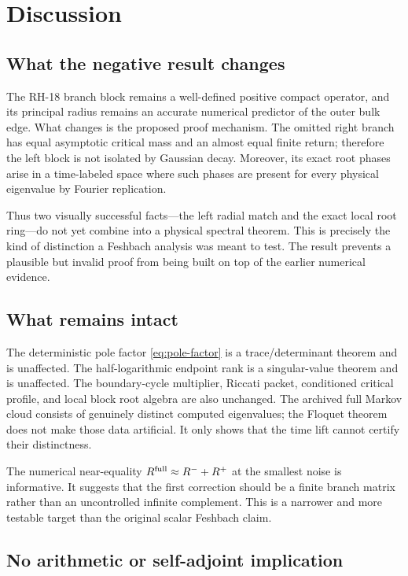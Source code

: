 \documentclass[11pt]{article}
\theoremstyle{definition}
\theoremstyle{remark}
\begin{document}
\section{Discussion}
\label{sec:discussion}

\subsection{What the negative result changes}

The RH-18 branch block remains a well-defined positive compact operator, and
its principal radius remains an accurate numerical predictor of the outer
bulk edge.  What changes is the proposed proof mechanism.  The omitted right
branch has equal asymptotic critical mass and an almost equal finite return;
therefore the left block is not isolated by Gaussian decay.  Moreover, its
exact root phases arise in a time-labeled space where such phases are present
for every physical eigenvalue by Fourier replication.

Thus two visually successful facts---the left radial match and the exact
local root ring---do not yet combine into a physical spectral theorem.  This
is precisely the kind of distinction a Feshbach analysis was meant to test.
The result prevents a plausible but invalid proof from being built on top of
the earlier numerical evidence.

\subsection{What remains intact}

The deterministic pole factor \eqref{eq:pole-factor} is a trace/determinant
theorem and is unaffected.  The half-logarithmic endpoint rank is a
singular-value theorem and is unaffected.  The boundary-cycle multiplier,
Riccati packet, conditioned critical profile, and local block root algebra
are also unchanged.  The archived full Markov cloud consists of genuinely
distinct computed eigenvalues; the Floquet theorem does not make those data
artificial.  It only shows that the time lift cannot certify their
distinctness.

The numerical near-equality
$R^{\rm full}\approx R^-+R^+$ at the smallest noise is informative.  It
suggests that the first correction should be a finite branch matrix rather
than an uncontrolled infinite complement.  This is a narrower and more
testable target than the original scalar Feshbach claim.

\subsection{No arithmetic or self-adjoint implication}
\end{document}
